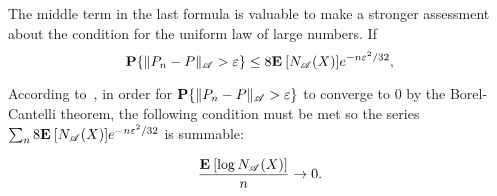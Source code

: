 The middle term in the last formula is valuable to make a stronger assessment about the condition for the uniform law of large numbers. If
\[ \P\{\|P_n-P\|_\AA > \varepsilon\} \leq 8 \E[N_\AA(X)] e^{-n\varepsilon^2/32},  \]

According to~\cite{devroye2013probabilistic}, in order for $\P\{\|P_n-P\|_\AA > \varepsilon\}$ to converge to 0 by the Borel-Cantelli theorem, the following condition must be met so the series $\sum_n 8 \E[N_\AA(X)] e^{-n\varepsilon^2/32}$ is summable:

\[ \frac{\E [\log N_\AA(X)]}{n} \to 0. \] 

